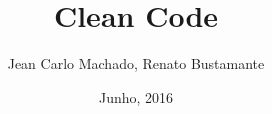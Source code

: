 \usepackage{graphicx}
\usepackage[utf8]{inputenc}
\title{Clean Code}
\author{Jean Carlo Machado, Renato Bustamante}
\date{Junho, 2016}
\usepackage[overlay,absolute]{textpos}
\usepackage{ragged2e}
\justifying
{}
\geometry{paperwidth=140mm,paperheight=105mm}
